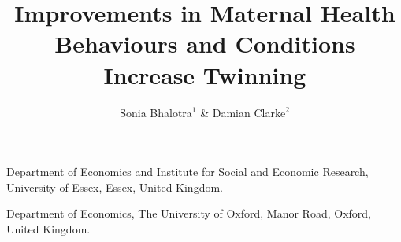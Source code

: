 \documentclass{nature}
\title{Improvements in Maternal Health Behaviours and Conditions Increase Twinning}
\author{Sonia Bhalotra$^{1}$ \& Damian Clarke$^2$}
\begin{document}
\maketitle

\begin{affiliations}
 \item Department of Economics and Institute for Social and Economic Research, University of Essex, Essex, United Kingdom.
 \item Department of Economics, The University of Oxford, Manor Road, Oxford, United Kingdom.
\end{affiliations}

\begin{linenumbers}  
\begin{abstract}
  


\end{abstract}
\end{linenumbers}
\end{document}
